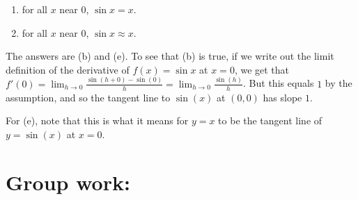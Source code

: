 \documentclass[handout,nooutcomes]{ximera}
\begin{document}
\begin{enumerate}
\begin{enumerate}
		\item for all $x$ near $0$, $\sin x = x$.
		
		\item for all $x$ near $0$, $\sin x \approx x$.
		
		\end{enumerate} 
	
			\begin{freeResponse}
			The answers are (b) and (e).  To see that (b) is true, if we write out the limit definition of the derivative of $f(x) = \sin x$ at $x=0$, we get that 
			$f'(0) = \lim_{h \to 0} \frac{\sin (h + 0) - \sin (0)}{h}
			= \lim_{h \to 0} \frac{\sin (h)}{h}$.  
			But this equals $1$ by the assumption, and so the tangent line to $\sin(x)$ at $(0,0)$ has slope $1$.  
			
			For (e), note that this is what it means for $y=x$ to be the tangent line of $y = \sin(x)$ at $x=0$.
			\end{freeResponse}
		
	\end{enumerate}
	
	
	
	
	
	

\section*{Group work:}
\end{document}
